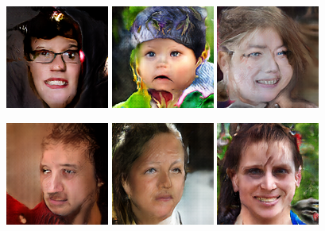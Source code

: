 \begin{figure}[!h]
    \centerline{
        \includegraphics[scale=1]{figures/ffhq/random/ffhq128x128_image0009.png}
        \includegraphics[scale=1]{figures/ffhq/random/ffhq128x128_image0010.png}
        \includegraphics[scale=1]{figures/ffhq/random/ffhq128x128_image0011.png}
    }
    \vspace{0.1cm}
    \centerline{
        \includegraphics[scale=1]{figures/ffhq/random/ffhq128x128_image0012.png}
        \includegraphics[scale=1]{figures/ffhq/random/ffhq128x128_image0013.png}
        \includegraphics[scale=1]{figures/ffhq/random/ffhq128x128_image0014.png}
}
\end{figure}
